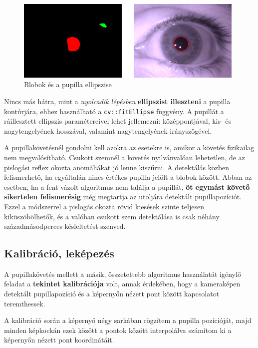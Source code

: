 \begin{figure}[!ht]
\centering
\includegraphics[width=110mm, keepaspectratio]{figures/blob_pupil.png}
\caption{Blobok és a pupilla ellipszise}
\label{fig:blob_pupil}
\end{figure}

Nincs más hátra, mint a \emph{nyolcadik lépésben} \textbf{ellipszist illeszteni} a pupilla kontúrjára, ehhez használható a \texttt{cv::fitEllipse} függvény. A pupillát a ráillesztett ellipszis paramétereivel lehet jellemezni: középpontjával, kis- és nagytengelyének hosszával, valamint nagytengelyének irányszögével.

\bigskip

A pupillakövetésnél gondolni kell azokra az esetekre is, amikor a követés fizikailag nem megvalósítható. Csukott szemnél a követés nyilvánvalóan lehetetlen, de az pislogási reflex okozta anomáliákat jó lenne kiszűrni. A detektálás közben felismerhető, ha egyáltalán nincs értékes pupilla-jelölt a blobok között. Abban az esetben, ha a fent vázolt algoritmus nem találja a pupillát, \textbf{öt egymást követő sikertelen felismerésig} még megtartja az utoljára detektált pupillapozíciót. Ezzel a módszerrel a pislogás okozta rövid kiesések szinte teljesen kiküszöbölhetők, és a valóban csukott szem detektálása is csak néhány századmásodperces késleltetést szenved.

\subsection{Kalibráció, leképezés}\label{sect:kalibracio}

A pupillakövetés mellett a másik, összetettebb algoritmus használatát igénylő feladat a \textbf{tekintet kalibrációja} volt, annak érdekében, hogy a kameraképen detektált pupillapozíció és a képernyőn nézett pont között kapcsolatot teremthessek.

A kalibráció során a képernyő négy sarkában rögzítem a pupilla pozícióját, majd minden képkockán ezek között a pontok között interpolálva számítom ki a képernyőn nézett pont koordinátáit.

